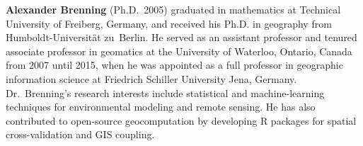 \documentclass[remotesensing,article,submit,moreauthors,pdftex]{Definitions/mdpi}
\begin{document}
\bio
{}
{\textbf{Alexander Brenning} (Ph.D.~2005) graduated in mathematics at Technical University of Freiberg, Germany, and received his Ph.D. in geography from Humboldt-Universität zu~Berlin.
	He served as an assistant professor and tenured associate professor in geomatics at the University of Waterloo, Ontario, Canada from 2007 until 2015, when he was appointed as a full professor in geographic information science at Friedrich Schiller University Jena, Germany.
	Dr.~Brenning's research interests include statistical and machine-learning techniques for environmental modeling and remote sensing.
	He has also contributed to open-source geocomputation by developing R packages for spatial cross-validation and GIS coupling.}

\end{document}

